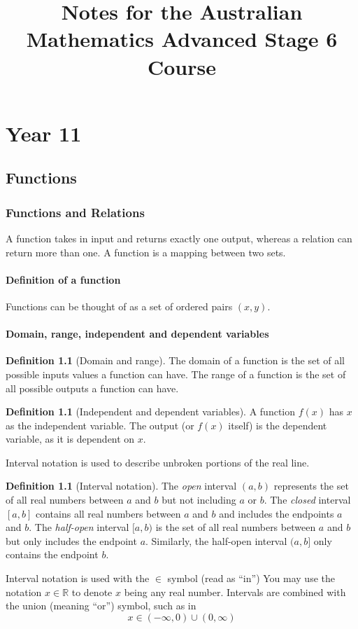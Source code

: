 \documentclass[12pt]{book}
\title{Notes for the Australian Mathematics Advanced Stage 6 Course}
\date{}
\theoremstyle{definition}
\newtheorem{defi}[theo]{Definition}
\newcommand{\bb}[1]{\mathbb{#1}}
\begin{document}
	\maketitle
	\tableofcontents
\part{Year 11}
\chapter{Functions}
\section{Functions and Relations}
  A function takes in input and returns exactly one output, whereas a relation can return more than one. A function is a
  mapping between two sets.
\subsection{Definition of a function}
  Functions can be thought of as a set of ordered pairs $(x,y)$.
\subsection{Domain, range, independent and dependent variables}
  \begin{defi}[Domain and range]
  	The domain of a function is the set of all possible inputs values a function can have. The range of a function is 
  	the set of all possible outputs a function can have.
  \end{defi}
  \begin{defi}[Independent and dependent variables]
  	A function $f(x)$ has $x$ as the independent variable. The output (or $f(x)$ itself) is the dependent variable, as it
  	is dependent on $x$.
  \end{defi}
  \noindent Interval notation is used to describe unbroken portions of the real line.
  \begin{defi}[Interval notation]
  	The \textit{open} interval $(a,b)$ represents the set of all real numbers between $a$ and $b$ but not including $a$ or $b$.
  	The \textit{closed} interval $[a,b]$ contains all real numbers between $a$ and $b$ and includes the endpoints $a$ and $b$. 
  	The \textit{half-open} interval $[a,b)$ is the set of all real numbers between $a$ and $b$ but only includes the endpoint $a$.
  	Similarly, the half-open interval $(a,b]$ only contains the endpoint $b$.
  \end{defi}
  Interval notation is used with the $\in$ symbol (read as ``in'') You may use the notation $x\in\bb{R}$ to denote $x$ being any 
  real number. Intervals are combined with the union (meaning ``or'') symbol, such as in \[x\in(-\infty,0)\cup(0,\infty)\]
\end{document}
